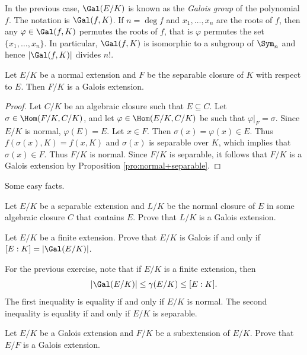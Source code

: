 In the previous case, $\Gal(E/K)$ is known as the \emph{Galois group}
of the polynomial $f$. The notation is $\Gal(f,K)$. If $n=\deg f$ and
$x_1,\dots,x_n$ are the roots of $f$, then any 
$\varphi\in\Gal(f,K)$ permutes the roots of $f$, that is
$\varphi$ permutes the 
set $\{x_1,\dots,x_n\}$. In particular, $\Gal(f,K)$ is isomorphic to a subgroup of
$\Sym_n$ and hence $|\Gal(f,K)|$ divides $n!$. 

\begin{proposition}
    Let $E/K$ be a normal extension and $F$ be the separable
    closure of $K$ with respect to $E$. 
    Then $F/K$ is a Galois extension.
\end{proposition}

\begin{proof} 
    Let $C/K$ be an algebraic closure such that $E\subseteq C$. Let $\sigma\in\Hom(F/K,C/K)$, and let $\varphi\in\Hom(E/K,C/K)$ be such that $\varphi|_F=\sigma$. Since $E/K$ is normal, 
    $\varphi(E)=E$. Let $x\in F$. Then $\sigma(x)=\varphi(x)\in E$. Thus
    $f(\sigma(x),K)=f(x,K)$ and $\sigma(x)$ is separable over $K$, which 
    implies that $\sigma(x)\in F$. Thus $F/K$ is normal. Since $F/K$ is separable, it follows
    that $F/K$ is a Galois extension by Proposition \ref{pro:normal+separable}.
\end{proof}

Some easy facts.

\begin{exercise}
    Let $E/K$ be a separable extension and $L/K$ be the normal 
    closure of $E$ in some algebraic closure $C$
    that contains $E$. Prove that $L/K$ is a Galois extension.
\end{exercise}

\begin{exercise}
    Let $E/K$ be a finite extension. Prove that $E/K$ is Galois
    if and only if $[E:K]=|\Gal(E/K)|$.
\end{exercise}

For the previous exercise, 
note that if $E/K$ is a finite extension, then  
\[
|\Gal(E/K)|\leq\gamma(E/K)\leq [E:K].
\]
The first inequality
is equality if and only if $E/K$ is normal. The second
inequality is equality if and only if $E/K$ is separable.

\begin{exercise}
    Let $E/K$ be a Galois extension and $F/K$ be a subextension of $E/K$. 
    Prove that $E/F$ is a Galois extension. 
\end{exercise}


